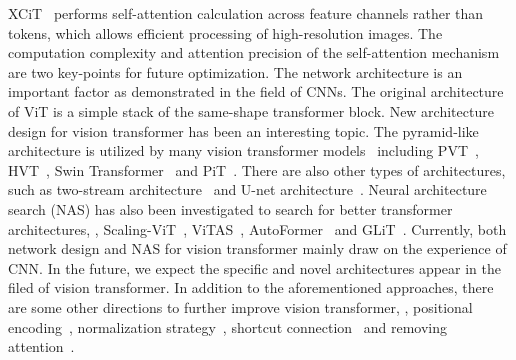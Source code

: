 XCiT~ performs self-attention calculation across feature channels rather than tokens, which allows efficient processing of high-resolution images. The computation complexity and attention precision of the self-attention mechanism are two key-points for future optimization.
The network architecture is an important factor as demonstrated in the field of CNNs. The original architecture of ViT is a simple stack of the same-shape transformer block.
New architecture design for vision transformer has been an interesting topic. The pyramid-like architecture is utilized by many vision transformer models~ including PVT~, HVT~, Swin Transformer~ and PiT~. There are also other types of architectures, such as two-stream architecture~ and U-net architecture~. Neural architecture search (NAS) has also been investigated to search for better transformer architectures, \eg, Scaling-ViT~, ViTAS~, AutoFormer~ and GLiT~. Currently, both network design and NAS for vision transformer mainly draw on the experience of CNN. In the future, we expect the specific and novel architectures appear in the filed of vision transformer.
In addition to the aforementioned approaches, there are some other directions to further improve vision transformer, \eg, positional encoding~, normalization strategy~, shortcut connection~ and removing attention~.
